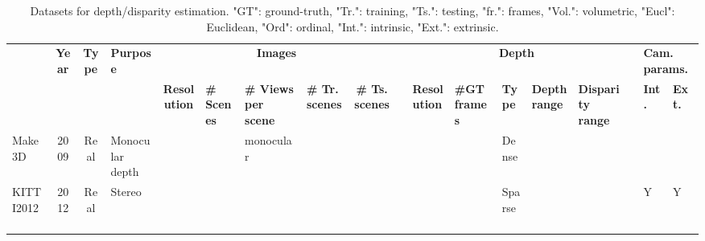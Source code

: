 \documentclass[10pt,journal,compsoc]{IEEEtran}
\begin{document}
\begin{table*}[t]
\caption{\label{tab:3ddatasets_sterep}\label{tab:3ddatasets_mvs}Datasets for depth/disparity estimation. "GT": ground-truth, "Tr.": training, "Ts.": testing, "fr.": frames, "Vol.": volumetric,  "Eucl": Euclidean, "Ord": ordinal, "Int.": intrinsic, "Ext.": extrinsic.   }
\resizebox{\linewidth}{!}
	{

    \begin{tabular}{@{}p{8.5em}@{ }c@{ } c@{ }p{11.915em}c@{ }p{7.5em}@{ }p{5.335em}@{ }p{5.5em}c@{ }c@{ }l@{ }p{8.665em}lll @{ }l  @{ }l@{ }l@{}}
   \toprule
   &   \multirow{2}{*}{\textbf{Year}}  &   \multirow{2}{7em}{\textbf{Type}} & \multicolumn{1}{p{11.915em}}{\multirow{2}{*}{\textbf{Purpose}}} & \multicolumn{5}{c}{\textbf{Images}}  & & \multicolumn{5}{c}{\textbf{Depth}}   & &\multicolumn{2}{l}{\textbf{Cam. params.}} \\
    \cline{5-9} \cline{11-15} \cline{17-18}
    
   &&  &  & \multicolumn{1}{c}{\textbf{Resolution}} & \multicolumn{1}{p{7.5em}}{\textbf{\# Scenes}} & \multicolumn{1}{p{5.335em}}{\textbf{\# Views per scene}} & \multicolumn{1}{p{5.585em}}{\textbf{\# Tr. scenes}} & \multicolumn{1}{p{5.335em}}{\textbf{\# Ts. scenes}} & &\multicolumn{1}{l}{\textbf{Resolution}} & \multicolumn{1}{p{7em}}{\textbf{\#GT frames}} & \textbf{Type} & \multicolumn{1}{p{5em}}{\textbf{Depth range}} & \multicolumn{1}{p{5em}}{\textbf{Disparity range}} & & \multicolumn{1}{l}{\textbf{Int.}} & \multicolumn{1}{l}{\textbf{Ext.}} \\
   
       
    \toprule
    
        {Make3D~\cite{saxena2009make3d}} & \multicolumn{1}{c}{2009} & \multicolumn{1}{p{7em}}{Real} & \multicolumn{1}{p{11.915em}}{Monocular depth} & \multicolumn{1}{c}{} & \multicolumn{1}{p{7.5em}}{} & \multicolumn{1}{p{5.335em}}{monocular} & \multicolumn{1}{p{5.585em}}{} & \multicolumn{1}{c}{} & & \multicolumn{1}{l}{} & \multicolumn{1}{l}{} & \multicolumn{1}{l}{Dense} &  &  & & \multicolumn{1}{r}{} & \multicolumn{1}{r}{} \\
        
        
     \hline   
     {KITTI2012~\cite{geiger2012we} } & \multicolumn{1}{c}{2012} & \multicolumn{1}{p{7em}}{Real} & \multicolumn{1}{p{11.915em}}{Stereo} & \multicolumn{1}{c}{} & \multicolumn{1}{p{7.5em}}{} & \multicolumn{1}{p{5.335em}}{} & \multicolumn{1}{p{5.585em}}{} & \multicolumn{1}{c}{} &&  \multicolumn{1}{l}{} & \multicolumn{1}{l}{} & Sparse &  &  && \multicolumn{1}{l}{Y} & \multicolumn{1}{l}{Y} \\
    

\end{tabular}}
\end{table*}
\end{document}
